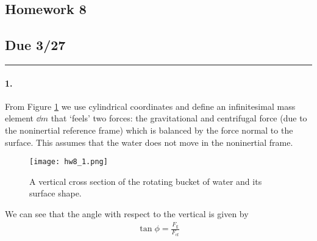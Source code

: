 \documentclass[../hw.tex]{subfiles}
\begin{document}
\setcounter{section}{8}
\begin{center}
  \section*{Homework 8} \label{sec:homework8}
  \subsection*{Due 3/27}
\end{center}
\hrule \vspace{10px}
\paragraph*{1.}
From Figure \ref{fig:hw8_1} we use cylindrical coordinates and define an infinitesimal mass element
$\dd{m}$ that `feels' two forces: the gravitational and centrifugal force (due to the noninertial
reference frame) which is balanced by the force normal to the surface. This assumes that the water
does not move in the noninertial frame.
\begin{figure}[ht]
    \centering
    \texttt{[image: hw8\_1.png]}
    \caption{A vertical cross section of the rotating bucket of water and its surface shape.}
    \label{fig:hw8_1}
\end{figure}

We can see that the angle with respect to the vertical is given by
\begin{align*}
    \tan \phi = \frac{F_{\text{g}}}{F_\text{cf}}
\end{align*}
\end{document}
